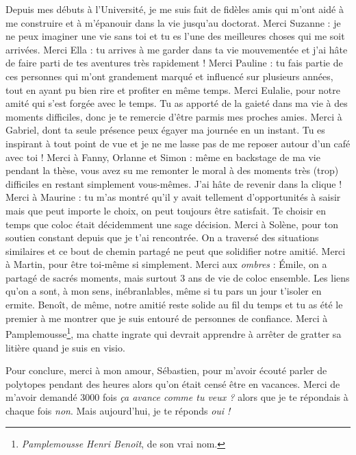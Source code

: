 Depuis mes débuts à l'Université, je me suis fait de fidèles amis qui m'ont aidé à me construire et à m'épanouir dans la vie jusqu'au doctorat.
Merci Suzanne : je ne peux imaginer une vie sans toi et tu es l'une des meilleures choses qui me soit arrivées. 
Merci Ella : tu arrives à me garder dans ta vie mouvementée et j'ai hâte de faire parti de tes aventures très rapidement !
Merci Pauline : tu fais partie de ces personnes qui m'ont grandement marqué et influencé sur plusieurs années, 
tout en ayant pu bien rire et profiter en même temps.
Merci Eulalie, pour notre amité qui s'est forgée avec le temps. Tu as apporté de la gaieté dans ma vie à des moments difficiles, donc je te remercie d'être parmis mes proches amies. 
Merci à Gabriel, dont ta seule présence peux égayer ma journée en un instant. Tu es inspirant à tout point de vue et je ne me lasse pas de me reposer autour d'un café avec toi !
Merci à Fanny, Orlanne et Simon : même en backstage de ma vie pendant la thèse, vous avez su me remonter
le moral à des moments très (trop) difficiles en restant simplement vous-mêmes. J'ai hâte de revenir dans la clique !
Merci à Maurine : tu m'as montré
qu'il y avait tellement d'opportunités à saisir mais que peut importe le choix, on peut toujours être satisfait. Te choisir en temps que coloc était
décidemment une sage décision. Merci à Solène, pour ton soutien constant depuis
que je t'ai rencontrée. On a traversé des situations similaires et ce bout de chemin partagé ne peut que solidifier notre amitié. 
Merci à Martin, pour être toi-même si simplement. 
Merci aux \emph{ombres} : Émile, on a partagé de sacrés moments,
mais surtout 3 ans de vie de coloc ensemble. Les liens qu'on a sont, à mon sens, inébranlables, même si tu pars un jour t'isoler en ermite. 
Benoît, de même, notre amitié reste solide au fil du temps et tu as été le premier à me montrer que je suis entouré de personnes de confiance. 
Merci à Pamplemousse\footnote{\emph{Pamplemousse Henri Benoît}, de son vrai nom.}, ma chatte ingrate qui devrait apprendre à arrêter de gratter sa litière quand je suis en visio.

Pour conclure, merci à mon amour, Sébastien, pour m'avoir écouté parler de polytopes pendant des heures alors qu'on était censé être en vacances. 
Merci de m'avoir demandé 3000 fois \emph{ça avance comme tu veux ?} alors que je te répondais à chaque fois \emph{non}. 
Mais aujourd'hui, je te réponds \emph{oui !}


